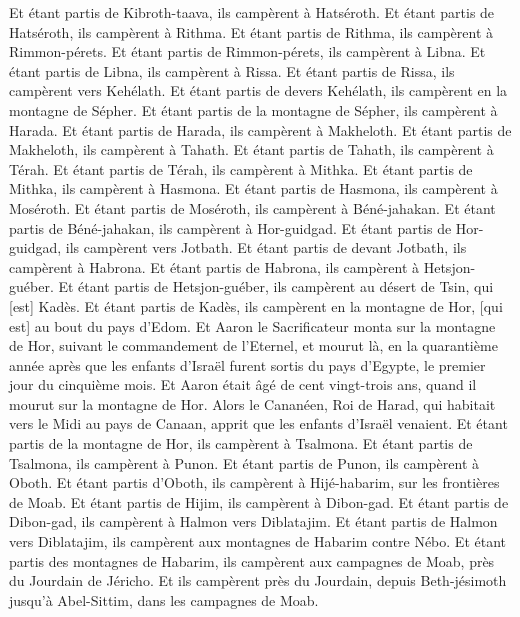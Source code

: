 \begin{multicols}{2}
Et étant partis de Kibroth-taava, ils campèrent à Hatséroth.
Et étant partis de Hatséroth, ils campèrent à Rithma.
Et étant partis de Rithma, ils campèrent à Rimmon-pérets.
Et étant partis de Rimmon-pérets, ils campèrent à Libna.
Et étant partis de Libna, ils campèrent à Rissa.
Et étant partis de Rissa, ils campèrent vers Kehélath.
Et étant partis de devers Kehélath, ils campèrent en la montagne de Sépher.
Et étant partis de la montagne de Sépher, ils campèrent à Harada.
Et étant partis de Harada, ils campèrent à Makheloth.
Et étant partis de Makheloth, ils campèrent à Tahath.
Et étant partis de Tahath, ils campèrent à Térah.
Et étant partis de Térah, ils campèrent à Mithka.
Et étant partis de Mithka, ils campèrent à Hasmona.
Et étant partis de Hasmona, ils campèrent à Moséroth.
Et étant partis de Moséroth, ils campèrent à Béné-jahakan.
Et étant partis de Béné-jahakan, ils campèrent à Hor-guidgad.
Et étant partis de Hor-guidgad, ils campèrent vers Jotbath.
Et étant partis de devant Jotbath, ils campèrent à Habrona.
Et étant partis de Habrona, ils campèrent à Hetsjon-guéber.
Et étant partis de Hetsjon-guéber, ils campèrent au désert de Tsin, qui [est] Kadès.
Et étant partis de Kadès, ils campèrent en la montagne de Hor, [qui est] au bout du pays d'Edom.
Et Aaron le Sacrificateur monta sur la montagne de Hor, suivant le commandement de l'Eternel, et mourut là, en la quarantième année après que les enfants d'Israël furent sortis du pays d'Egypte, le premier jour du cinquième mois.
Et Aaron était âgé de cent vingt-trois ans, quand il mourut sur la montagne de Hor.
Alors le Cananéen, Roi de Harad, qui habitait vers le Midi au pays de Canaan, apprit que les enfants d'Israël venaient.
Et étant partis de la montagne de Hor, ils campèrent à Tsalmona.
Et étant partis de Tsalmona, ils campèrent à Punon.
Et étant partis de Punon, ils campèrent à Oboth.
Et étant partis d'Oboth, ils campèrent à Hijé-habarim, sur les frontières de Moab.
Et étant partis de Hijim, ils campèrent à Dibon-gad.
Et étant partis de Dibon-gad, ils campèrent à Halmon vers Diblatajim.
Et étant partis de Halmon vers Diblatajim, ils campèrent aux montagnes de Habarim contre Nébo.
Et étant partis des montagnes de Habarim, ils campèrent aux campagnes de Moab, près du Jourdain de Jéricho.
Et ils campèrent près du Jourdain, depuis Beth-jésimoth jusqu'à Abel-Sittim, dans les campagnes de Moab.

\end{multicols}
